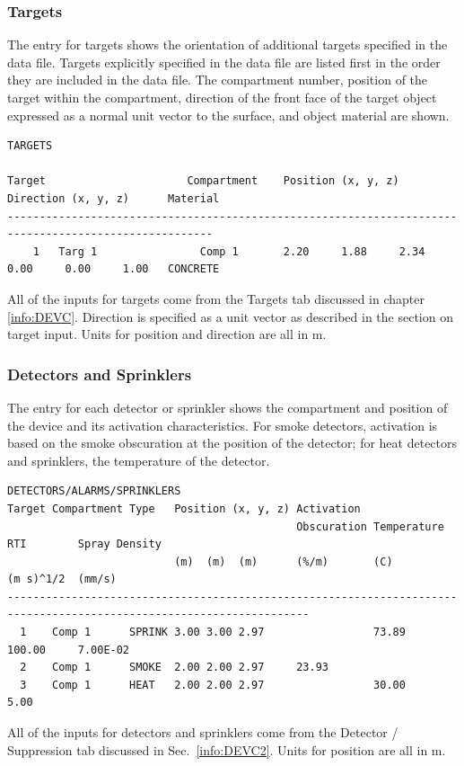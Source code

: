 \subsubsection{Targets}

The entry for targets shows the orientation of additional targets specified in the data file. Targets explicitly specified in the data file are listed first in the order they are included in the data file. The compartment number, position of the target within the compartment, direction of the front face of the target object expressed as a normal unit vector to the surface, and object material are shown.
\begin{lstlisting}[basicstyle=\tiny]
TARGETS

Target                      Compartment    Position (x, y, z)         Direction (x, y, z)      Material
------------------------------------------------------------------------------------------------------
    1   Targ 1                Comp 1       2.20     1.88     2.34     0.00     0.00     1.00   CONCRETE
\end{lstlisting}
All of the inputs for targets come from the Targets tab discussed in chapter \ref{info:DEVC}. Direction is specified as a unit vector as described in the section on target input. Units for position and direction are all in m.

\subsubsection{Detectors and Sprinklers}

The entry for each detector or sprinkler shows the compartment and position of the device and its activation characteristics. For smoke detectors, activation is based on the smoke obscuration at the position of the detector; for heat detectors and sprinklers, the temperature of the detector.
\begin{lstlisting}[basicstyle=\tiny]
DETECTORS/ALARMS/SPRINKLERS
Target Compartment Type   Position (x, y, z) Activation
                                             Obscuration Temperature RTI        Spray Density
                          (m)  (m)  (m)      (%/m)       (C)         (m s)^1/2  (mm/s)
---------------------------------------------------------------------------------------------------------------------
  1    Comp 1      SPRINK 3.00 3.00 2.97                 73.89       100.00     7.00E-02
  2    Comp 1      SMOKE  2.00 2.00 2.97     23.93
  3    Comp 1      HEAT   2.00 2.00 2.97                 30.00         5.00
\end{lstlisting}
All of the inputs for detectors and sprinklers come from the Detector / Suppression tab discussed in Sec.~\ref{info:DEVC2}. Units for position are all in m.

